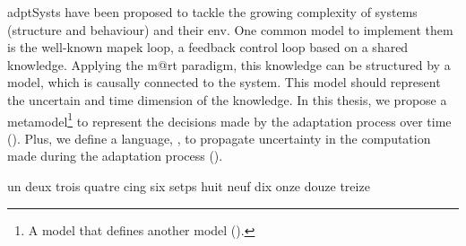 \Glspl{adptSyst} have been proposed to tackle the growing complexity of systems (structure and behaviour) and their \gls{env}.
One common model to implement them is the well-known \gls{mapek} loop, a feedback control loop based on a shared knowledge.
Applying the \gls{m@rt} paradigm, this knowledge can be structured by a \gls{model}, which is causally connected to the system.
This \gls{model} should represent the uncertain and time dimension of the knowledge.
In this thesis, we propose a \gls{metamodel}\footnote{A model that defines another model (\cf {}).} to represent the decisions made by the adaptation process over time (\cf {}).
Plus, we define a language, \langName, to propagate uncertainty in the computation made during the adaptation process (\cf {}).

un
deux
trois
quatre
cing
six
setps
huit
neuf
dix
onze
douze
treize







